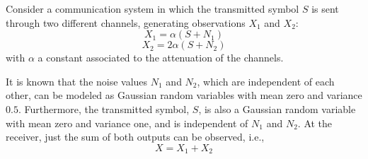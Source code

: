 \begin{solution}
\end{solution}


\else
%
\question[25]  %

Consider a communication system in which the transmitted symbol $S$ is sent through two different channels, generating observations $X_1$ and $X_2$:
$$X_1 = \alpha ( S +N_1)$$
$$X_2 = 2 \alpha ( S +N_2)$$
with $\alpha$ a constant associated to the attenuation of the channels.

It is known that the noise values $N_1$ and $N_2$, which are independent of each other, can be modeled as Gaussian random variables with mean zero and variance $0.5$. Furthermore, the transmitted symbol, $S$, is also a Gaussian random variable with mean zero and variance one, and is independent of $N_1$ and $N_2$. At the receiver, just the sum of both outputs can be observed, i.e., 
$$X= X_1 + X_2$$

